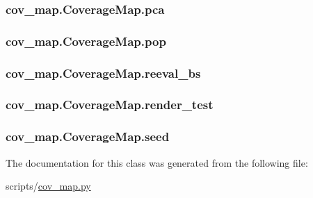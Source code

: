 \subsubsection[{\texorpdfstring{pca}{pca}}]{\setlength{\rightskip}{0pt plus 5cm}cov\+\_\+map.\+Coverage\+Map.\+pca}\hypertarget{classcov__map_1_1_coverage_map_aa8d8c0e95cf5617aa4d18cb9335592e0}{}\label{classcov__map_1_1_coverage_map_aa8d8c0e95cf5617aa4d18cb9335592e0}
\subsubsection[{\texorpdfstring{pop}{pop}}]{\setlength{\rightskip}{0pt plus 5cm}cov\+\_\+map.\+Coverage\+Map.\+pop}\hypertarget{classcov__map_1_1_coverage_map_adab4eae44ef355e92bd88b4183cfc96b}{}\label{classcov__map_1_1_coverage_map_adab4eae44ef355e92bd88b4183cfc96b}
\subsubsection[{\texorpdfstring{reeval\+\_\+bs}{reeval_bs}}]{\setlength{\rightskip}{0pt plus 5cm}cov\+\_\+map.\+Coverage\+Map.\+reeval\+\_\+bs}\hypertarget{classcov__map_1_1_coverage_map_af44582dd33ed5806aa162e2f0b18ea62}{}\label{classcov__map_1_1_coverage_map_af44582dd33ed5806aa162e2f0b18ea62}
\subsubsection[{\texorpdfstring{render\+\_\+test}{render_test}}]{\setlength{\rightskip}{0pt plus 5cm}cov\+\_\+map.\+Coverage\+Map.\+render\+\_\+test}\hypertarget{classcov__map_1_1_coverage_map_a182aa56a3b650b1662a5dde1b2439958}{}\label{classcov__map_1_1_coverage_map_a182aa56a3b650b1662a5dde1b2439958}
\subsubsection[{\texorpdfstring{seed}{seed}}]{\setlength{\rightskip}{0pt plus 5cm}cov\+\_\+map.\+Coverage\+Map.\+seed}\hypertarget{classcov__map_1_1_coverage_map_aa8bf1edd9453a41f261f571b6022a9fb}{}\label{classcov__map_1_1_coverage_map_aa8bf1edd9453a41f261f571b6022a9fb}


The documentation for this class was generated from the following file\+:\begin{DoxyCompactItemize}
\item 
scripts/\hyperlink{cov__map_8py}{cov\+\_\+map.\+py}\end{DoxyCompactItemize}
